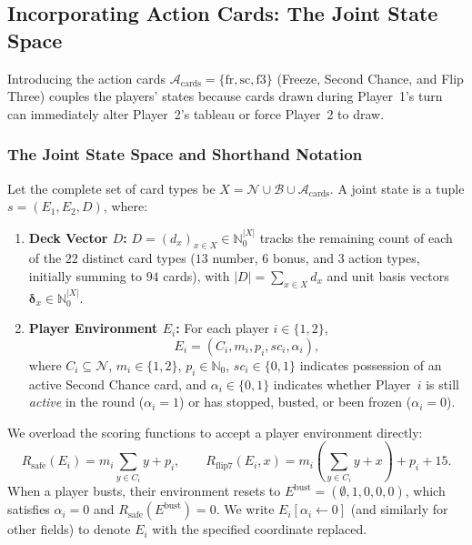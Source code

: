 \documentclass{article}
\theoremstyle{plain}
\theoremstyle{definition}
\theoremstyle{remark}
\begin{document}
\subsection{Incorporating Action Cards: The Joint State Space}
Introducing the action cards $\mathcal{A}_{\text{cards}} = \{\text{fr}, \text{sc}, \text{f3}\}$ (Freeze, Second Chance, and Flip Three) couples the players' states because cards drawn during Player~1's turn can immediately alter Player~2's tableau or force Player~2 to draw.

\subsubsection{The Joint State Space and Shorthand Notation}
Let the complete set of card types be $X = \mathcal{N} \cup \mathcal{B} \cup \mathcal{A}_{\text{cards}}$. A joint state is a tuple $s = (E_1, E_2, D)$, where:
\begin{enumerate}
    \item \textbf{Deck Vector $D$:} $D = (d_x)_{x \in X} \in \mathbb{N}_0^{|X|}$ tracks the remaining count of each of the $22$ distinct card types ($13$ number, $6$ bonus, and $3$ action types, initially summing to $94$ cards), with $|D| = \sum_{x \in X} d_x$ and unit basis vectors $\boldsymbol{\delta}_x \in \mathbb{N}_0^{|X|}$.
    \item \textbf{Player Environment $E_i$:} For each player $i \in \{1, 2\}$,
    \[
        E_i = (C_i, m_i, p_i, sc_i, \alpha_i),
    \]
    where $C_i \subseteq \mathcal{N}$, $m_i \in \{1, 2\}$, $p_i \in \mathbb{N}_0$, $sc_i \in \{0, 1\}$ indicates possession of an active Second Chance card, and $\alpha_i \in \{0, 1\}$ indicates whether Player~$i$ is still \textit{active} in the round ($\alpha_i = 1$) or has stopped, busted, or been frozen ($\alpha_i = 0$).
\end{enumerate}
We overload the scoring functions to accept a player environment directly:
\[
    R_{\text{safe}}(E_i) = m_i \sum_{y \in C_i} y + p_i, \qquad
    R_{\text{flip7}}(E_i, x) = m_i \left( \sum_{y \in C_i} y + x \right) + p_i + 15.
\]
When a player busts, their environment resets to $E^{\text{bust}} = (\emptyset, 1, 0, 0, 0)$, which satisfies $\alpha_i = 0$ and $R_{\text{safe}}(E^{\text{bust}}) = 0$. We write $E_i[\alpha_i \leftarrow 0]$ (and similarly for other fields) to denote $E_i$ with the specified coordinate replaced.
\end{document}

